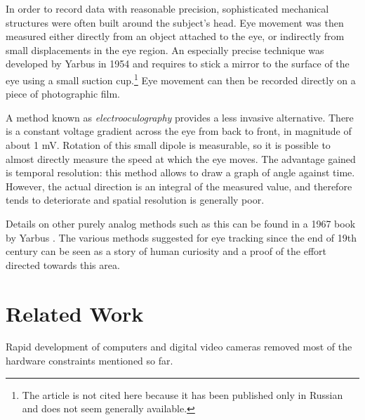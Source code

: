 In order to record data with reasonable precision, sophisticated mechanical structures were often built around the subject's head.
Eye movement was then measured either directly from an object attached to the eye, or indirectly from small displacements in the eye region.
An especially precise technique was developed by Yarbus in 1954 and requires to stick a mirror to the surface of the eye using a small suction cup.\footnote{The article is not cited here because it has been published only in Russian and does not seem generally available.}
Eye movement can then be recorded directly on a piece of photographic film.

A method known as \textit{electrooculography} provides a less invasive alternative.
There is a constant voltage gradient across the eye from back to front, in magnitude of about 1 mV.
Rotation of this small dipole is measurable, so it is possible to almost directly measure the speed at which the eye moves.
The advantage gained is temporal resolution: this method allows to draw a graph of angle against time.
However, the actual direction is an integral of the measured value, and therefore tends to deteriorate and spatial resolution is generally poor.

Details on other purely analog methods such as this can be found in a 1967 book by Yarbus \cite{yarbus1967}.
The various methods suggested for eye tracking since the end of 19th century can be seen as a story of human curiosity and a proof of the effort directed towards this area.

\section{Related Work}

Rapid development of computers and digital video cameras removed most of the hardware constraints mentioned so far.


